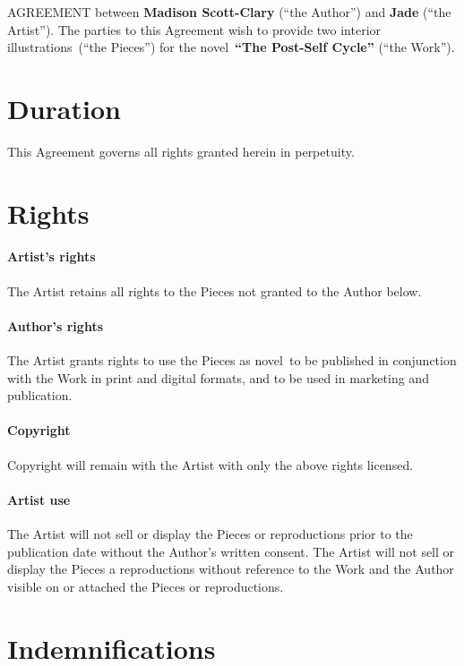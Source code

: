 \documentclass[12pt,letterpaper]{article}
\def\WorkTitle{The Post-Self Cycle}
\def\WorkAuthor{Madison Scott-Clary}
\def\WorkType{novel}
\def\Artist{Jade}
\def\ArtType{two interior illustrations}
\begin{document}
\noindent AGREEMENT between \textbf{\WorkAuthor} (``the Author'') and \textbf{\Artist} (``the Artist''). The parties to this Agreement wish to provide \ArtType\ (``the Pieces'') for the \WorkType\ \textbf{``\WorkTitle''} (``the Work'').

\section{Duration}

This Agreement governs all rights granted herein in perpetuity.

\section{Rights}

\paragraph{Artist's rights}

The Artist retains all rights to the Pieces not granted to the Author below.

\paragraph{Author's rights}

The Artist grants rights to use the Pieces as \WorkType\ to be published in conjunction with the Work in print and digital formats, and to be used in marketing and publication.

\paragraph{Copyright}

Copyright will remain with the Artist with only the above rights licensed.

\paragraph{Artist use}

The Artist will not sell or display the Pieces or reproductions prior to the publication date without the Author's written consent. The Artist will not sell or display the Pieces a reproductions without reference to the Work and the Author visible on or attached the Pieces or reproductions.

\section{Indemnifications}
\end{document}
